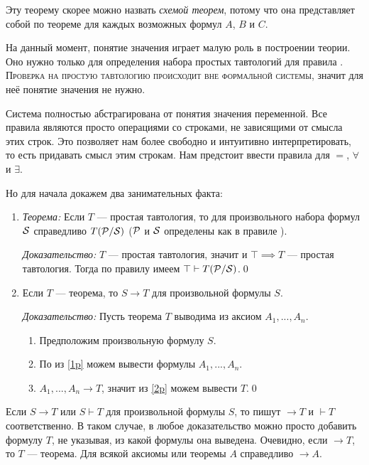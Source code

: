 Эту теорему скорее можно назвать {\it схемой теорем}, потому что она представляет
собой по теореме для каждых возможных формул $A$, $B$ и $C$.

На данный момент, понятие значения играет малую роль в построении теории.
Оно нужно только для определения набора простых тавтологий для правила \taut{}.
\textsc{Проверка на простую тавтологию
	происходит вне формальной системы}, значит для неё понятие значения не нужно.

Система полностью абстрагирована от понятия значения переменной.
Все правила являются просто операциями со строками, не зависящими от смысла
этих строк. Это позволяет нам более свободно и интуитивно интерпретировать, то
есть придавать смысл этим строкам.
Нам предстоит ввести правила для $=$, $\forall$ и $\exists$.

Но для начала докажем два занимательных факта:

\begin{enumerate}
	\item{}{\it Теорема:}
	Если $T$ --- простая тавтология, то
	для произвольного набора формул $\mathcal S$ справедливо $T(\mathcal P/\mathcal S)$
	($\mathcal P$ и $\mathcal S$ определены как в правиле \taut{}).

		{\it Доказательство:}
	$T$ --- простая тавтология, значит и
	${\top\implies T}$ --- простая тавтология. Тогда по правилу \taut{} имеем
	$\top\vdash T(\mathcal P/\mathcal S)$.\qed

	\item{}Если $T$ --- теорема, то $S\to T$ для произвольной формулы $S$.

		{\it Доказательство:}
	Пусть теорема $T$ выводима из аксиом $A_1,...,A_{n}$.
	\begin{enumerate}[label=(\roman*)]
		\item{}\label{1p}Предположим произвольную формулу $S$.
		\item{}\label{2p}По \axiom{} из \ref{1p} можем вывести
		формулы $A_1,...,A_{n}$.
		\item{}\label{3p}$A_1,...,A_{n}\to T$, значит из \ref{2p} можем вывести $T$.\qed
	\end{enumerate}
\end{enumerate}

Если $S\to T$ или $S\vdash T$ для произвольной формулы $S$,
то пишут $\to T$ и $\vdash T$ соответственно. В таком случае,
в любое доказательство можно просто добавить формулу $T$,
не указывая, из какой формулы она выведена. Очевидно,
если $\to T$, то $T$ --- теорема. Для всякой аксиомы или теоремы $A$
справедливо $\to A$.

